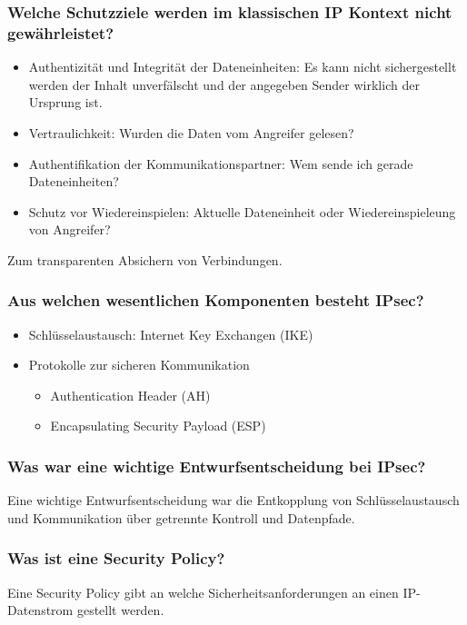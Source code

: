 		\subsubsection{Welche Schutzziele werden im klassischen IP Kontext nicht gewährleistet?}
	\begin{itemize}
		\item Authentizität und Integrität der Dateneinheiten: Es kann nicht sichergestellt werden der Inhalt unverfälscht und der angegeben Sender wirklich der Ursprung ist.
		\item Vertraulichkeit: Wurden die Daten vom Angreifer gelesen?
		\item Authentifikation der Kommunikationspartner: Wem sende ich gerade Dateneinheiten?
		\item Schutz vor Wiedereinspielen: Aktuelle Dateneinheit oder Wiedereinspieleung von Angreifer?
	\end{itemize}
	
	Zum transparenten Absichern von Verbindungen.
	
	\subsubsection{Aus welchen wesentlichen Komponenten besteht IPsec?}
	\begin{itemize}
		\item Schlüsselaustausch: Internet Key Exchangen (IKE)
		\item Protokolle zur sicheren Kommunikation
		\begin{itemize}
			\item Authentication Header (AH)
			\item Encapsulating Security Payload (ESP)
		\end{itemize}
	\end{itemize}
	
	\subsubsection{Was war eine wichtige Entwurfsentscheidung bei IPsec?}
	Eine wichtige Entwurfsentscheidung war die Entkopplung von Schlüsselaustausch und Kommunikation über getrennte Kontroll und Datenpfade.
	
	\subsubsection{Was ist eine Security Policy?}
	Eine Security Policy gibt an welche Sicherheitsanforderungen an einen IP-Datenstrom gestellt werden.
	

